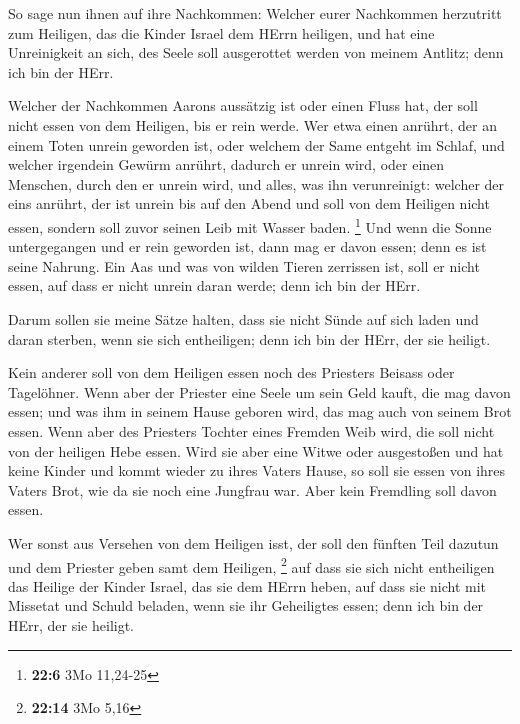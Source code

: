  So sage nun ihnen auf ihre Nachkommen: Welcher eurer
Nachkommen herzutritt zum Heiligen, das die Kinder Israel dem HErrn
heiligen, und hat eine Unreinigkeit an sich, des Seele soll ausgerottet
werden von meinem Antlitz; denn ich bin der HErr.

 Welcher der Nachkommen Aarons aussätzig ist oder einen
Fluss hat, der soll nicht essen von dem Heiligen, bis er rein werde. Wer
etwa einen anrührt, der an einem Toten unrein geworden ist, oder welchem
der Same entgeht im Schlaf,  und welcher irgendein Gewürm
anrührt, dadurch er unrein wird, oder einen Menschen, durch den er
unrein wird, und alles, was ihn verunreinigt:  welcher der
eins anrührt, der ist unrein bis auf den Abend und soll von dem Heiligen
nicht essen, sondern soll zuvor seinen Leib mit Wasser baden.
\footnote{\textbf{22:6} 3Mo 11,24-25}  Und wenn die Sonne
untergegangen und er rein geworden ist, dann mag er davon essen; denn es
ist seine Nahrung.  Ein Aas und was von wilden Tieren
zerrissen ist, soll er nicht essen, auf dass er nicht unrein daran
werde; denn ich bin der HErr.

 Darum sollen sie meine Sätze halten, dass sie nicht Sünde
auf sich laden und daran sterben, wenn sie sich entheiligen; denn ich
bin der HErr, der sie heiligt.

 Kein anderer soll von dem Heiligen essen noch des
Priesters Beisass oder Tagelöhner.  Wenn aber der Priester
eine Seele um sein Geld kauft, die mag davon essen; und was ihm in
seinem Hause geboren wird, das mag auch von seinem Brot essen.
 Wenn aber des Priesters Tochter eines Fremden Weib wird,
die soll nicht von der heiligen Hebe essen.  Wird sie aber
eine Witwe oder ausgestoßen und hat keine Kinder und kommt wieder zu
ihres Vaters Hause, so soll sie essen von ihres Vaters Brot, wie da sie
noch eine Jungfrau war. Aber kein Fremdling soll davon essen.

 Wer sonst aus Versehen von dem Heiligen isst, der soll den
fünften Teil dazutun und dem Priester geben samt dem Heiligen,
\footnote{\textbf{22:14} 3Mo 5,16}  auf dass sie sich nicht
entheiligen das Heilige der Kinder Israel, das sie dem HErrn heben,
 auf dass sie nicht mit Missetat und Schuld beladen, wenn
sie ihr Geheiligtes essen; denn ich bin der HErr, der sie heiligt.

